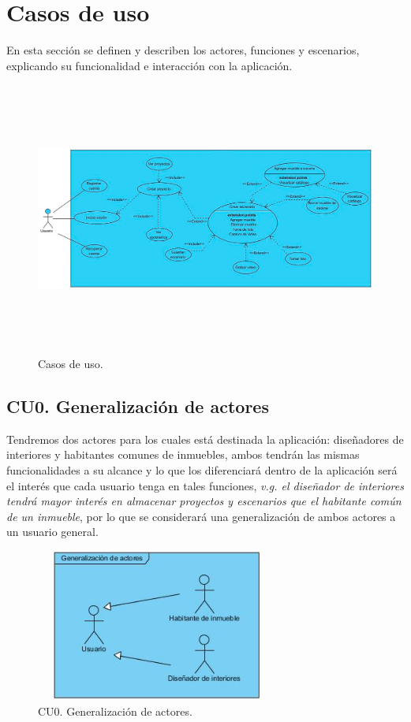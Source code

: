 
\newpage
\section{Casos de uso}
En esta sección se definen y describen los actores, funciones y escenarios, explicando su funcionalidad e interacción con la aplicación.\par
\vspace{5mm}
\begin{figure}[!htbp]
	\centering
	\includegraphics[width=17cm,height=9cm]{imagenes/analisis/cu/cu_complete.png}
	\caption{Casos de uso.}
	\label{fig:casosdeuso}
\end{figure}  
\newpage

\subsection{CU0. Generalización de actores}\par
Tendremos dos actores para los cuales está destinada la aplicación: diseñadores de interiores y habitantes comunes de inmuebles, ambos tendrán las mismas funcionalidades a su alcance y lo que los diferenciará dentro de la aplicación será el interés que cada usuario tenga en tales funciones, \textit{v.g. el diseñador de interiores tendrá mayor interés en almacenar proyectos y escenarios que el habitante común de un inmueble}, por lo que se considerará una generalización de ambos actores a un usuario general.

\begin{figure}[!htbp]
	\centering
	\includegraphics[width=8cm,height=5cm]{imagenes/analisis/cu/generalizacion.jpg}
	\caption{CU0. Generalización de actores.}
	\label{fig:generalizacionactores}
\end{figure} 


